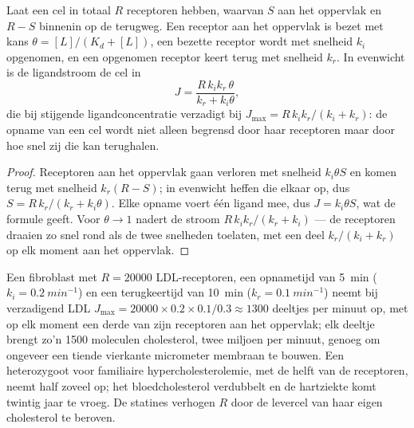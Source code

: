 \begin{proposition}\label{prop:b3:membrane-traffic:uptake}
Laat een cel in totaal $R$ receptoren hebben, waarvan $S$ aan het
oppervlak en $R - S$ binnenin op de terugweg. Een receptor aan het
oppervlak is bezet met kans $\theta = [L]/(K_{d} + [L])$, een bezette
receptor wordt met snelheid $k_{i}$ opgenomen, en een opgenomen
receptor keert terug met snelheid $k_{r}$. In evenwicht is de
ligandstroom de cel in
\[
J = \frac{R\,k_{i}k_{r}\,\theta}{k_{r} + k_{i}\theta},
\]
die bij stijgende ligandconcentratie verzadigt bij $J_{\max} =
R\,k_{i}k_{r}/(k_{i} + k_{r})$: de opname van een cel wordt niet alleen
begrensd door haar receptoren maar door hoe snel zij die kan
terughalen.
\end{proposition}
\begin{proof}
Receptoren aan het oppervlak gaan verloren met snelheid $k_{i}\theta S$
en komen terug met snelheid $k_{r}(R - S)$; in evenwicht heffen die
elkaar op, dus $S = R\,k_{r}/(k_{r}
+ k_{i}\theta)$. Elke opname voert één ligand mee, dus $J =
k_{i}\theta S$, wat de formule geeft. Voor $\theta \to 1$ nadert de
stroom $R\,k_{i}k_{r}/(k_{r} + k_{i})$ --- de receptoren draaien zo snel
rond als de twee snelheden toelaten, met een deel $k_{r}/(k_{i} + k_{r})$
op elk moment aan het oppervlak.
\end{proof}

\begin{example}\label{ex:b3:membrane-traffic:ldl}
Een fibroblast met $R = \num{20000}$ LDL-receptoren, een opnametijd van
\qty{5}{min} ($k_{i} = \qty{0.2}{min^{-1}}$) en een terugkeertijd van
\qty{10}{min} ($k_{r} = \qty{0.1}{min^{-1}}$) neemt bij verzadigend LDL
$J_{\max} = \num{20000}\times 0.2\times 0.1/0.3 \approx 1300$ deeltjes
per minuut op, met op elk moment een derde van zijn receptoren aan het
oppervlak; elk deeltje brengt zo'n \num{1500} moleculen cholesterol,
twee miljoen per minuut, genoeg om ongeveer een tiende vierkante
micrometer membraan te bouwen. Een heterozygoot voor familiaire
hypercholesterolemie, met de helft van de receptoren, neemt half zoveel
op; het bloedcholesterol verdubbelt en de hartziekte komt twintig jaar
te vroeg. De statines verhogen $R$ door de levercel van haar eigen
cholesterol te beroven.
\end{example}

